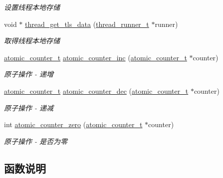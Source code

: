 \begin{DoxyCompactItemize}
\begin{DoxyCompactList}\small\item\em 设置线程本地存储 \end{DoxyCompactList}\item 
void $\ast$ \hyperlink{a00109_ga63c9be5b8fb04c0b26382f51b7bdf237_ga63c9be5b8fb04c0b26382f51b7bdf237}{thread\+\_\+get\+\_\+tls\+\_\+data} (\hyperlink{a00051_a9054159cde2f926ef61c28ce1e555199_a9054159cde2f926ef61c28ce1e555199}{thread\+\_\+runner\+\_\+t} $\ast$runner)
\begin{DoxyCompactList}\small\item\em 取得线程本地存储 \end{DoxyCompactList}\item 
\hyperlink{a00051_a0d043bbb6b8db19fea54ab9271d352b6_a0d043bbb6b8db19fea54ab9271d352b6}{atomic\+\_\+counter\+\_\+t} \hyperlink{a00109_gade4f41f1cd519f2719b5114ce7801232_gade4f41f1cd519f2719b5114ce7801232}{atomic\+\_\+counter\+\_\+inc} (\hyperlink{a00051_a0d043bbb6b8db19fea54ab9271d352b6_a0d043bbb6b8db19fea54ab9271d352b6}{atomic\+\_\+counter\+\_\+t} $\ast$counter)
\begin{DoxyCompactList}\small\item\em 原子操作 -\/ 递增 \end{DoxyCompactList}\item 
\hyperlink{a00051_a0d043bbb6b8db19fea54ab9271d352b6_a0d043bbb6b8db19fea54ab9271d352b6}{atomic\+\_\+counter\+\_\+t} \hyperlink{a00109_gafc2df03d75cf9168b72e8c5e11953437_gafc2df03d75cf9168b72e8c5e11953437}{atomic\+\_\+counter\+\_\+dec} (\hyperlink{a00051_a0d043bbb6b8db19fea54ab9271d352b6_a0d043bbb6b8db19fea54ab9271d352b6}{atomic\+\_\+counter\+\_\+t} $\ast$counter)
\begin{DoxyCompactList}\small\item\em 原子操作 -\/ 递减 \end{DoxyCompactList}\item 
int \hyperlink{a00109_ga141897cac9743394a99ff7780daa6a80_ga141897cac9743394a99ff7780daa6a80}{atomic\+\_\+counter\+\_\+zero} (\hyperlink{a00051_a0d043bbb6b8db19fea54ab9271d352b6_a0d043bbb6b8db19fea54ab9271d352b6}{atomic\+\_\+counter\+\_\+t} $\ast$counter)
\begin{DoxyCompactList}\small\item\em 原子操作 -\/ 是否为零 \end{DoxyCompactList}\end{DoxyCompactItemize}


\subsection{函数说明}
\hypertarget{a00109_gafc2df03d75cf9168b72e8c5e11953437_gafc2df03d75cf9168b72e8c5e11953437}{}
